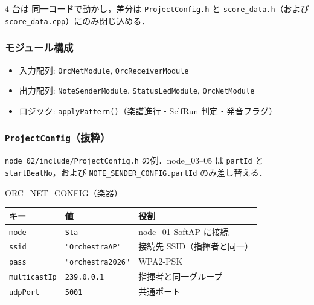 \documentclass[lualatex,book,paper=a4paper,jafontsize=11.5pt,jafontscale=1.05]{jlreq}
\begin{document}
4 台は \textbf{同一コード}で動かし，差分は \texttt{ProjectConfig.h} と
\texttt{score\_data.h}（および \texttt{score\_data.cpp}）にのみ閉じ込める．

\subsubsection{モジュール構成}

\begin{itemize}
  \item 入力配列: \texttt{OrcNetModule}, \texttt{OrcReceiverModule}
  \item 出力配列: \texttt{NoteSenderModule}, \texttt{StatusLedModule}, \texttt{OrcNetModule}
  \item ロジック: \texttt{applyPattern()}（楽譜進行・SelfRun 判定・発音フラグ）
\end{itemize}

\subsubsection{\texttt{ProjectConfig}（抜粋）}

\texttt{node\_02/include/ProjectConfig.h} の例．node\_03--05 は \texttt{partId} と
\texttt{startBeatNo}，および \texttt{NOTE\_SENDER\_CONFIG.partId} のみ差し替える．

\begin{apibox}{ORC\_NET\_CONFIG（楽器）}
\begin{tabular}{l l p{}}
\toprule
\textbf{キー} & \textbf{値} & \textbf{役割} \\
\midrule
\texttt{mode}        & \texttt{Sta}              & node\_01 SoftAP に接続 \\
\texttt{ssid}        & \texttt{"OrchestraAP"}    & 接続先 SSID（指揮者と同一） \\
\texttt{pass}        & \texttt{"orchestra2026"}  & WPA2-PSK \\
\texttt{multicastIp} & \texttt{239.0.0.1}        & 指揮者と同一グループ \\
\texttt{udpPort}     & \texttt{5001}             & 共通ポート \\
\bottomrule
\end{tabular}
\end{apibox}
\end{document}

